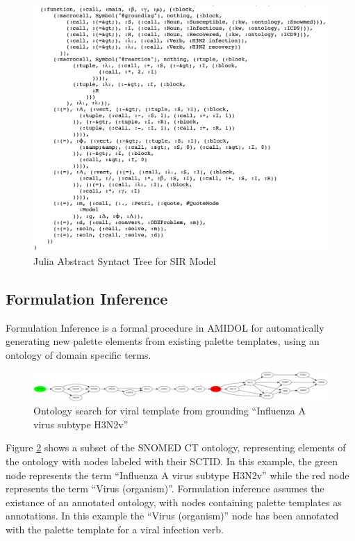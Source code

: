 \documentclass[11pt]{article}
\theoremstyle{definition}
\newcommand{\amidol}{\textsc{AMIDOL}}
\begin{document}
\begin{figure}
  \includegraphics[width=\textwidth]{AST.png}
  \caption{Julia Abstract Syntact Tree for SIR Model}
  \label{Fig:JuliaAST}
\end{figure}

\subsection{Formulation Inference}

Formulation Inference is a formal procedure in \amidol{} for
automatically generating new palette elements from existing palette
templates, using an ontology of domain specific terms.

\begin{figure}
  \includegraphics[width=\textwidth]{H3N2vmap.png}
  \caption{Ontology search for viral template from grounding
    ``Influenza A virus subtype H3N2v''}
  \label{Fig:ontology1}
\end{figure}

Figure \ref{Fig:ontology1} shows a subset of the SNOMED CT ontology,
representing elements of the ontology with nodes labeled with their
SCTID.  In this example, the green node represents the term
``Influenza A virus subtype H3N2v'' while the red node represents the
term ``Virus (organism)''.  Formulation inference assumes the
existance of an annotated ontology, with nodes containing palette
templates as annotations.  In this example the ``Virus (organism)''
node has been annotated with the palette template for a viral
infection verb.
\end{document}
